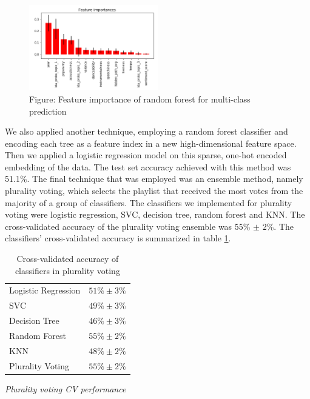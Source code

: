 \documentclass[acmtog]{acmart}
\begin{document}
\begin{figure}[h]
  \includegraphics[width=0.5\textwidth]{feature_importance2.png}
  \caption{Figure: Feature importance of random forest for multi-class prediction}
  \label{fig:ROC_curve}
\end{figure}

\newpage

We also applied another technique, employing a random forest classifier and encoding each tree as a feature index in a new high-dimensional feature space. Then we applied a logistic regression model on this sparse, one-hot encoded embedding of the data. The test set accuracy achieved with this method was 51.1\%.
The final technique that was employed was an ensemble method, namely plurality voting, which selects the playlist that received the most votes from the majority of a group of classifiers. The classifiers we implemented for plurality voting were logistic regression, SVC, decision tree, random forest and KNN. The cross-validated accuracy of the plurality voting ensemble was 55\% $\pm$ 2\%. The classifiers' cross-validated accuracy is summarized in table \ref{tab:two}.  
\begin{table}%
\caption{Cross-validated accuracy of classifiers in plurality voting}
\label{tab:two}
\begin{minipage}{\columnwidth}
\begin{center}
\begin{tabular}{ll}
  \toprule
  Logistic Regression    & $51\% \pm 3\%$\\
  SVC  & $49\% \pm 3\%$\\
  Decision Tree  & $46\% \pm 3\%$\\
  Random Forest  & $55\% \pm 2\%$\\
  KNN  & $48\% \pm 2\%$\\
  Plurality Voting  & $55\% \pm 2\%$\\
  \bottomrule
\end{tabular}
\end{center}
\bigskip\centering
\footnotesize
 \emph{Plurality voting CV performance} 
\end{minipage}
\end{table}%
\newpage
\end{document}
